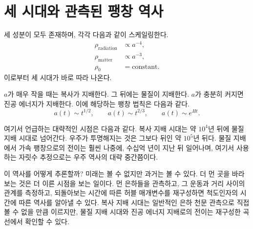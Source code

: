 \begin{classroomqa}
\end{classroomqa}

\begin{classroomqa}
\end{classroomqa}

\section{세 시대와 관측된 팽창 역사}

세 성분이 모두 존재하며, 각각 다음과 같이 스케일링한다.
\begin{equation}
\begin{aligned}
\rho_{\text{radiation}}&\propto a^{-4},\\
\rho_{\text{matter}}&\propto a^{-3},\\
\rho_0&=\text{constant}.
\end{aligned}
\end{equation}
이로부터 세 시대가 바로 따라 나온다.

\(a\)가 매우 작을 때는 복사가 지배한다. 그 뒤에는 물질이 지배한다. \(a\)가 충분히 커지면 진공 에너지가 지배한다. 이에 해당하는 팽창 법칙은 다음과 같다.
\begin{equation}
a(t)\sim t^{1/2},
\qquad
a(t)\sim t^{2/3},
\qquad
a(t)\sim e^{Ht}.
\end{equation}

여기서 언급하는 대략적인 시점은 다음과 같다. 복사 지배 시대는 약 \(10^4\)년 뒤에 물질 지배 시대로 넘어간다. 우주가 투명해지는 것은 그보다 뒤인 약 \(10^5\)년 뒤다. 물질 지배에서 가속 팽창으로의 전이는 훨씬 나중에, 수십억 년이 지난 뒤 일어나며, 여기서 사용하는 자릿수 추정으로는 우주 역사의 대략 중간쯤이다.

이 역사를 어떻게 추론할까? 미래는 볼 수 없지만 과거는 볼 수 있다. 더 먼 곳을 바라보는 것은 더 이른 시점을 보는 일이다. 먼 은하들을 관측하고, 그 운동과 거리 사이의 관계를 측정하고, 되돌아보는 시간에 따른 허블 매개변수를 재구성하면 척도인자의 시간에 따른 역사를 알아낼 수 있다. 복사 지배 시대는 일반적인 은하 천문 관측으로 직접 볼 수 없을 만큼 이르지만, 물질 지배 시대와 진공 에너지 지배로의 전이는 재구성한 곡선에서 확인할 수 있다.


